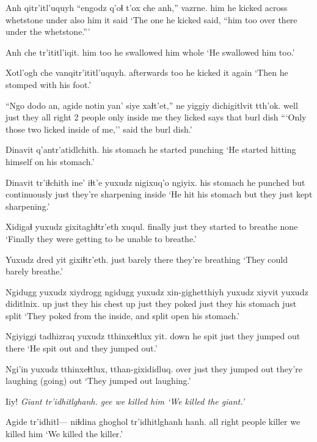 \documentclass[12pt]{article}
\begin{document}
\gll Anh qitr'itl'uquyh ``engodz q'oɬ t'ox che anh,'' vazrne. 
him {he kicked} across whetstone under also him {it said}
\glt `The one he kicked said, ``him too over there under the whetstone.'''
\glend

\gll Anh che tr'ititl'iqit.
him too {he swallowed him whole}
\glt `He swallowed him too.'
\glend

\gll Xotl'ogh che vanqitr'ititl'uquyh.
afterwards too {he kicked it again}
\glt `Then he stomped with his foot.'
\glend

\gll ``Ngo dodo an, agide notin yan' siye xaɬt'et,'' ne yiggiy dichigitlvit tth'ok.
well just they {all right} {2 people} only {inside me} {they licked} says that burl dish
\glt ```Only those two licked inside of me,'' said the burl dish.'
\glend

\gll Dinavit q'antr'atidlchith. 
{his stomach} {he started punching}
\glt `He started hitting himself on his stomach.'
\glend

\gll Dinavit tr'iɬchith ine' iɬt'e yuxudz nigixuq'o ngiyix.
{his stomach} {he punched} but continuously just {they're sharpening} inside
\glt `He hit his stomach but they just kept sharpening.'
\glend

\gll Xidigaɬ yuxudz gixitaghɬtr'eth xuqul.
finally just {they started to breathe} none
\glt `Finally they were getting to be unable to breathe.'
\glend

\gll Yuxudz dred yit gixiɬtr'eth.
just barely there {they're breathing}
\glt `They could barely breathe.'
\glend

\gll Ngidugg yuxudz xiydrogg ngidugg yuxudz xin-gighetthiyh yuxudz xiyvit yuxudz diditlnix.
up just {they his chest} up just {they poked} just {they his stomach} just {split}
\glt `They poked from the inside, and split open his stomach.'
\glend

\gll Ngiyiggi tadhizraq yuxudz tthinxeɬtlux yit.
down {he spit} just {they jumped out} there
\glt `He spit out and they jumped out.'
\glend

\gll Ngi'in yuxudz tthinxeɬtlux, tthan-gixididluq.
over just {they jumped out} {they're laughing (going) out}
\glt `They jumped out laughing.'
\glend

\gll Iiy!  \em{Giant} tr'idhitlghanh. 
gee {} {we killed him}
\glt `We killed the giant.'
\glend

\gll Agide tr'idhitl--- {niɬdina ghoghol} tr'idhitlghanh hanh.
{all right} {} {people killer} {we killed} him
\glt `We killed the killer.'
\glend
\end{document}
